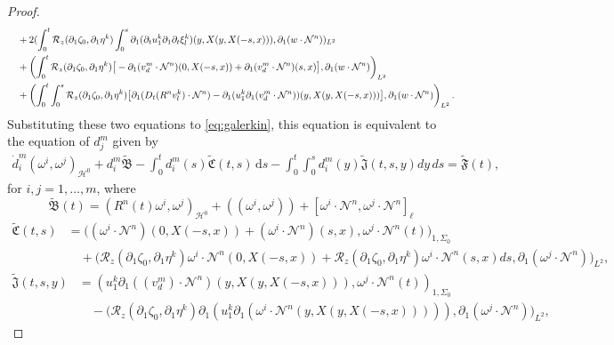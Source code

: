 \documentclass[letterpaper,reqno,10pt,twoside]{amsart}
\theoremstyle{definition}
\theoremstyle{remark}
\def\p{\partial}
\begin{document}
\begin{proof}
\[\begin{aligned}
			&\quad+2(\int_{0}^{t}\mathcal{R}_{z}(\partial_{1}\zeta_{0},\partial_{1}\eta^{k})\int_{0}^{s}\p_{1}(\partial_{t}u_{1}^{k}\partial_{1}\partial_{t}\xi_{l}^{k})(y,X(y,X(-s,x))),\partial_{1}(w\cdot \mathcal{N}^{n}))_{L^{2}}\notag\\
			&\quad+\left(\int_{0}^{t}\mathcal{R}_{z}(\partial_{1}\zeta_{0},\partial_{1}\eta^{k})\big[ -\p_{1}(v_{d}^{m} \cdot \mathcal{N}^{n})(0,X(-s,x)) + \p_{1} (v_{d}^{m} \cdot \mathcal{N}^{n})(s,x)\big] ,\p_{1}(w\cdot \mathcal{N}^{n}) \right)_{L^{2}}\\
			&\quad+ \left(\int_{0}^{t}\int_{0}^{s}\mathcal{R}_{z}(\p_{1}\zeta_{0},\p_{1}\eta^{k})\big[\p_{1}(D_{t}(R^{n}v_{l}^{k})\cdot \mathcal{N}^{n}) - \p_{1}(u_{1}^{k}\partial_{1}(v_{d}^{m} \cdot \mathcal{N}^{n}))(y,X(y,X(-s,x)))\big],\partial_{1}(w\cdot \mathcal{N}^{n})\right)_{L^{2}}.
		\end{aligned}\]
		\noindent Substituting these two equations to \eqref{eq:galerkin}, this equation is equivalent to the equation of $d^m_j$ given by
		\begin{equation}\label{eq:galerkin_2}
			\begin{aligned}
				\dot{d}^m_i(\omega^i,\omega^j)_{\mathcal{H}^0}+d^m_i\tilde{\mathfrak{B}} -\int_{0}^{t}d_{i}^{m}(s) \tilde{\mathfrak{C}}(t,s)\,\mathrm{d}s-\int_{0}^{t}\int_{0}^{s}d_{i}^{m}(y) \tilde{\mathfrak{J}}(t,s,y)dy\,ds= \tilde{\mathfrak{F}}(t),
			\end{aligned}
		\end{equation}
		for $i,j=1, \dots, m$, where
		\[
		\tilde{\mathfrak{B}}(t) = (R^{n}(t)\omega^i,\omega^j)_{\mathcal{H}^0}+((\omega^i,\omega^j))+[\omega^i\cdot\mathcal{N}^{n},\omega^j\cdot\mathcal{N}^{n}]_{\ell}
		\]
		\[
		\begin{aligned}
			\tilde{\mathfrak{C}}(t,s)&=\Big((\omega^{i}\cdot \mathcal{N}^{n})(0,X(-s,x)) +(\omega^{i}\cdot \mathcal{N}^{n})(s,x),\omega^{j}\cdot \mathcal{N}^{n}(t) \Big)_{1,\Sigma_{0}}\\
			&\quad+ \Big( \mathcal{R}_{z}(\p_{1}\zeta_{0},\p_{1}\eta^{k})\omega^{i}\cdot \mathcal{N}^{n}(0,X(-s,x)) + \mathcal{R}_{z}(\p_{1}\zeta_{0},\p_{1}\eta^{k})\omega^{i}\cdot \mathcal{N}^{n}(s,x)ds,\p_{1}(\omega^{j}\cdot \mathcal{N}^{n}) \Big)_{L^{2}},
		\end{aligned} 
		\]
		\[
		\begin{aligned}
			\tilde{\mathfrak{J}}(t,s, y) & =(u_{1}^{k}\partial_{1}((v_{d}^{m})\cdot \mathcal{N}^{n})(y,X(y,X(-s,x))), \omega^{j}\cdot\mathcal{N}^{n}(t))_{1,\Sigma_{0}}\\
			&\quad- \Big(\mathcal{R}_{z}(\p_{1}\zeta_{0},\p_{1}\eta^{k})\p_{1}(u_{1}^{k}\p_{1}(\omega^{i}\cdot \mathcal{N}^{n}(y,X(y,X(-s,x))))),\p_{1}(\omega^{j}\cdot \mathcal{N}^{n}) \Big)_{L^{2}},

\end{aligned}\]
\end{proof}
\end{document}
